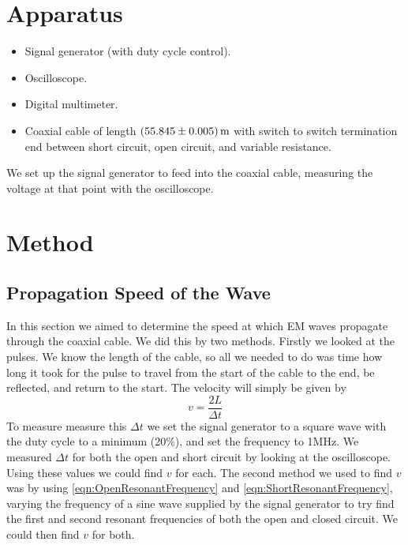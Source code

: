 \documentclass[12pt]{article}
\numberwithin{equation}{section}
\numberwithin{figure}{section}
\begin{document}
    \section{Apparatus}\label{sec:Apparatus}
    \begin{itemize}
        \item Signal generator (with duty cycle control).
        \item Oscilloscope.
        \item Digital multimeter.
        \item Coaxial cable of length $\SI{55.845\pm0.005}{\metre}$ with switch to switch termination 
        end between short circuit, open circuit, and variable resistance. 
    \end{itemize}
    We set up the signal generator to feed into the coaxial cable, measuring the voltage at that 
    point with the oscilloscope. 

    \section{Method}\label{sec:Method}
    \subsection{Propagation Speed of the Wave}\label{sec:PropagationSpeed}
    In this section we aimed to determine the speed at which EM waves propagate through the 
    coaxial cable. We did this by two methods. \newline
    \newline
    Firstly we looked at the pulses. We know the length of the cable, so all we needed to do was 
    time how long it took for the pulse to travel from the start of the cable to the end, be 
    reflected, and return to the start. The velocity will simply be given by 
    \begin{equation}
        v=\frac{2L}{\Delta t}
        \label{eqn:PulseVelocity}
    \end{equation}
    To measure measure this $\Delta t$ we set the signal generator to a square wave with the 
    duty cycle to a minimum (20\%), and set the frequency to 1MHz. We measured $\Delta t$ for 
    both the open and short circuit by looking at the oscilloscope. Using these values we 
    could find $v$ for each. \newline
    \newline
    The second method we used to find $v$ was by using \autoref{eqn:OpenResonantFrequency} and 
    \autoref{eqn:ShortResonantFrequency}, varying the frequency of a sine wave supplied by the 
    signal generator to try find the first and second resonant frequencies of both the open and 
    closed circuit. We could then find $v$ for both. 
\end{document}
